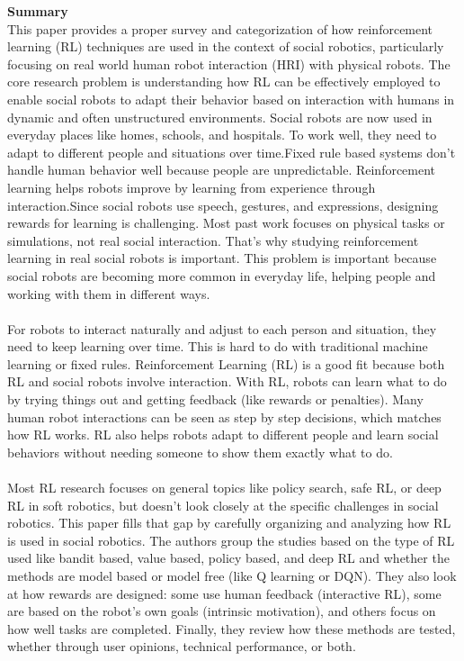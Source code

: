 \documentclass[report.tex]{subfiles}
\begin{document}
\noindent\textbf{Summary} \\
This paper provides a proper survey and categorization of how reinforcement learning (RL) techniques are used in the context of social robotics, particularly focusing on real world human robot interaction (HRI) with physical robots. The core research problem is understanding how RL can be effectively employed to enable social robots to adapt their behavior based on interaction with humans in dynamic and often unstructured environments. Social robots are now used in everyday places like homes, schools, and hospitals. To work well, they need to adapt to different people and situations over time.Fixed rule based systems don’t handle human behavior well because people are unpredictable. Reinforcement learning helps robots improve by learning from experience through interaction.Since social robots use speech, gestures, and expressions, designing rewards for learning is challenging. Most past work focuses on physical tasks or simulations, not real social interaction. That’s why studying reinforcement learning in real social robots is important.
This problem is important because social robots are becoming more common in everyday life, helping people and working with them in different ways. \\\\For robots to interact naturally and adjust to each person and situation, they need to keep learning over time. This is hard to do with traditional machine learning or fixed rules. Reinforcement Learning (RL) is a good fit because both RL and social robots involve interaction. With RL, robots can learn what to do by trying things out and getting feedback (like rewards or penalties). Many human robot interactions can be seen as step by step decisions, which matches how RL works. RL also helps robots adapt to different people and learn social behaviors without needing someone to show them exactly what to do.\\
\noindent\textbf{}\\ Most RL research focuses on general topics like policy search, safe RL, or deep RL in soft robotics, but doesn’t look closely at the specific challenges in social robotics. This paper fills that gap by carefully organizing and analyzing how RL is used in social robotics. The authors group the studies based on the type of RL used like bandit based, value based, policy based, and deep RL and whether the methods are model based or model free (like Q learning or DQN). They also look at how rewards are designed: some use human feedback (interactive RL), some are based on the robot’s own goals (intrinsic motivation), and others focus on how well tasks are completed. Finally, they review how these methods are tested, whether through user opinions, technical performance, or both.
\end{document}
